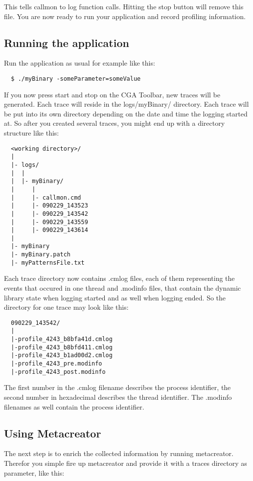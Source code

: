 This tells callmon to log function calls. Hitting the stop button will remove this file. You are now ready to run your application and record profiling information.

\subsection{Running the application} Run the application as usual for example like this:
\begin{verbatim}
  $ ./myBinary -someParameter=someValue
\end{verbatim}

If you now press start and stop on the CGA Toolbar, new traces will be generated. Each trace will reside in the logs/myBinary/ directory. Each trace will be put into its own directory depending on the date and time the logging started at. So after you created several traces, you might end up with a directory structure like this:   

\begin{verbatim}
  <working directory>/
  |
  |- logs/
  |  |
  |  |- myBinary/
  |     |
  |     |- callmon.cmd
  |     |- 090229_143523
  |     |- 090229_143542
  |     |- 090229_143559
  |     |- 090229_143614
  |
  |- myBinary
  |- myBinary.patch
  |- myPatternsFile.txt
\end{verbatim}

Each trace directory now contains .cmlog files, each of them representing the events that occured in one thread and .modinfo files, that contain the dynamic library state when logging started and as well when logging ended. So the directory for one trace may look like this: 

\begin{verbatim}
  090229_143542/
  |
  |-profile_4243_b8bfa41d.cmlog
  |-profile_4243_b8bfd411.cmlog
  |-profile_4243_b1ad00d2.cmlog
  |-profile_4243_pre.modinfo
  |-profile_4243_post.modinfo
\end{verbatim}

The first number in the .cmlog filename describes the process identifier, the second number in hexadecimal describes the thread identifier. The .modinfo filenames as well contain the process identifier.

\subsection{Using Metacreator} The next step is to enrich the collected information by running metacreator. Therefor you simple fire up metacreator and provide it with a traces directory as parameter, like this:

